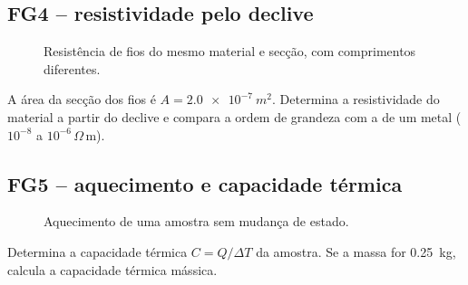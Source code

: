 \documentclass[11pt,a4paper,oneside]{book}
\begin{document}
\subsection*{FG4 -- resistividade pelo declive}
\begin{figure}[H]
\centering
{}
\caption{Resistência de fios do mesmo material e secção, com comprimentos diferentes.}
\end{figure}
\begin{exercicios}[title=Exercício FG4]
A área da secção dos fios é $A=\SI{2.0e-7}{m^2}$. Determina a resistividade do material a partir do declive e compara a ordem de grandeza com a de um metal ($10^{-8}$ a $10^{-6}\,\Omega\,\mathrm m$).
\end{exercicios}

\subsection*{FG5 -- aquecimento e capacidade térmica}
\begin{figure}[H]
\centering
{}
\caption{Aquecimento de uma amostra sem mudança de estado.}
\end{figure}
\begin{exercicios}[title=Exercício FG5]
Determina a capacidade térmica $C=Q/\Delta T$ da amostra. Se a massa for \SI{0.25}{kg}, calcula a capacidade térmica mássica.
\end{exercicios}
\end{document}
